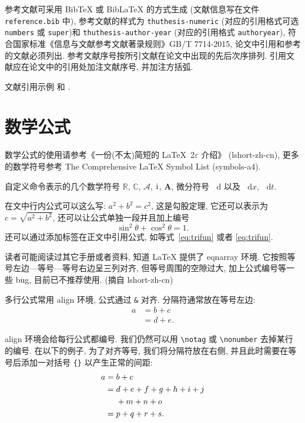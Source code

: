 \documentclass[UTF8,openany]{ctexbook}
\numberwithin{equation}{chapter}
\numberwithin{figure}{chapter}
\numberwithin{table}{chapter}
\theoremstyle{mystyle}
\newcommand{\dif}{\mathop{}\!\mathrm{d}}
\newcommand{\CC}{\ensuremath{\mathbb{C}}}
\newcommand{\RR}{\ensuremath{\mathbb{R}}}
\newcommand{\dx}[1][x]{\mathop{}\!\mathrm{d}#1}
\newcommand{\ii}{\mathrm{i}\mkern1mu} %
\newcommand{\A}{\mathcal{A}}
\newcommand{\bA}{\boldsymbol{A}}
\begin{document}
参考文献可采用 BibTeX 或 BibLaTeX 的方式生成 (文献信息写在文件 \verb|reference.bib| 中), 参考文献的样式为 \verb|thuthesis-numeric| (对应的引用格式可选 \verb|numbers| 或  \verb|super|)和 \verb|thuthesis-author-year| (对应的引用格式 \verb|authoryear|), 符合国家标准《信息与文献参考文献著录规则》GB/T 7714-2015, 论文中引用和参考的文献必须列出. 参考文献序号按所引文献在论文中出现的先后次序排列. 引用文献应在论文中的引用处加注文献序号, 并加注方括弧.

文献引用示例 \cite{LiLiu1997} 和 \cite{Adams2003,Shen1994}.


\section{数学公式}\label{sec:2-3}

数学公式的使用请参考《一份(不太)简短的 \LaTeX~2$\varepsilon$ 介绍》 (lshort-zh-cn), 更多的数学符号参考 The Comprehensive LaTeX Symbol List (symbols-a4).

自定义命令表示的几个数学符号 $\RR$, $\CC$, $\A$, $\ii$, $\bA$, 微分符号 $\dif$ 以及 $\dx$, $\dx[t]$.

在文中行内公式可以这么写: $a^2+b^2=c^2$, 这是勾股定理, 它还可以表示为 $c=\sqrt{a^2+b^2}$, 还可以让公式单独一段并且加上编号
\begin{equation}\label{eq:trifun}
\sin^2{\theta}+\cos^2{\theta}=1.
\end{equation}
还可以通过添加标签在正文中引用公式, 如等式~\eqref{eq:trifun} 或者 \ref{eq:trifun}.

读者可能阅读过其它手册或者资料, 知道 LaTeX 提供了 eqnarray 环境. 它按照等号左边—等号—等号右边呈三列对齐, 但等号周围的空隙过大, 加上公式编号等一些 bug, 目前已不推荐使用. (摘自 lshort-zh-cn)

多行公式常用 align 环境, 公式通过 \verb|&| 对齐. 分隔符通常放在等号左边:
\begin{align}
a & = b + c \\
& = d + e.
\end{align}

align 环境会给每行公式都编号. 我们仍然可以用 \verb|\notag| 或 \verb|\nonumber| 去掉某行的编号. 在以下的例子,
为了对齐等号, 我们将分隔符放在右侧, 并且此时需要在等号后添加一对括号 \verb|{}| 以产生正常的间距:
\begin{align}
a ={} & b + c \\
={} & d + e + f + g + h + i + j \notag \\
& + m + n + o \\
={} & p + q + r + s.
\end{align}
\end{document}
